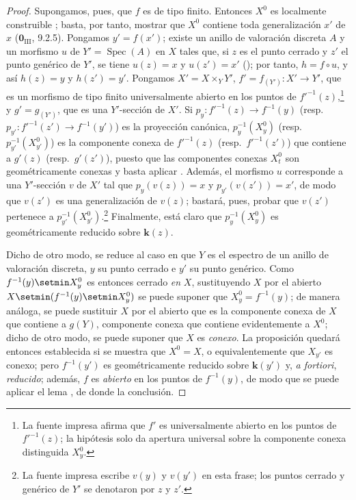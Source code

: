 \begin{proof}
Supongamos, pues, que $f$ es de tipo finito.
Entonces $X^0$ es localmente construible ; basta, por tanto, mostrar que $X^0$ contiene toda generalización $x'$ de $x$ ($\mathbf{0}_{\mathrm{III}}$, 9.2.5).
Pongamos $y'=f(x')$; existe un anillo de valoración discreta $A$ y un morfismo $u$ de $Y'=\operatorname{Spec}(A)$ en $X$ tales que, si $z$ es el punto cerrado y $z'$ el punto genérico de $Y'$, se tiene $u(z)=x$ y $u(z')=x'$ (); por tanto, $h=f\circ u$, y así $h(z)=y$ y $h(z')=y'$.
Pongamos $X'=X\times_Y Y'$, $f'=f_{(Y')}:X'\to Y'$, que es un morfismo de tipo finito universalmente abierto en los puntos de $f'^{-1}(z)$,\footnote{La fuente impresa afirma que $f'$ es universalmente abierto en los puntos de $f'^{-1}(z)$; la hipótesis solo da apertura universal sobre la componente conexa distinguida $X_y^0$.} y $g'=g_{(Y')}$, que es una $Y'$-sección de $X'$.
Si $p_y:f'^{-1}(z)\to f^{-1}(y)$ (resp.\ $p_{y'}:f'^{-1}(z')\to f^{-1}(y')$) es la proyección canónica, $p_y^{-1}(X_y^0)$ (resp.\ $p_{y'}^{-1}(X_{y'}^0)$) es la componente conexa de $f'^{-1}(z)$ (resp.\ $f'^{-1}(z')$) que contiene a $g'(z)$ (resp.\ $g'(z')$), puesto que las componentes conexas $X_t^0$ son geométricamente conexas  y basta aplicar .
Además, el morfismo $u$ corresponde a una $Y'$-sección $v$ de $X'$ tal que $p_y(v(z))=x$ y $p_{y'}(v(z'))=x'$, de modo que $v(z')$ es una generalización de $v(z)$; bastará, pues, probar que $v(z')$ pertenece a $p_{y'}^{-1}(X_{y'}^0)$.\footnote{La fuente impresa escribe $v(y)$ y $v(y')$ en esta frase; los puntos cerrado y genérico de $Y'$ se denotaron por $z$ y $z'$.}
Finalmente, está claro que $p_y^{-1}(X_y^0)$ es geométricamente reducido sobre $\boldsymbol{k}(z)$.

Dicho de otro modo, se reduce al caso en que $Y$ es el espectro de un anillo de valoración discreta, $y$ su punto cerrado e $y'$ su punto genérico.
Como $f^{-1}(y)\setmin X_y^0$ es entonces cerrado \emph{en} $X$, sustituyendo $X$ por el abierto $X\setmin(f^{-1}(y)\setmin X_y^0)$ se puede suponer que $X_y^0=f^{-1}(y)$; de manera análoga, se puede sustituir $X$ por el abierto que es la componente conexa de $X$ que contiene a $g(Y)$, componente conexa que contiene evidentemente a $X^0$; dicho de otro modo, se puede suponer que $X$ es \emph{conexo}.
La proposición quedará entonces establecida si se muestra que $X^0=X$, o equivalentemente que $X_{y'}$ es conexo; pero $f^{-1}(y')$ es geométricamente reducido sobre $\boldsymbol{k}(y')$ y, \emph{a fortiori}, \emph{reducido}; además, $f$ es \emph{abierto} en los puntos de $f^{-1}(y)$, de modo que se puede aplicar el lema , de donde la conclusión.
\end{proof}

